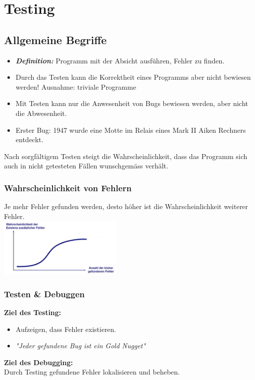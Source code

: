 \section{Testing}
\subsection{Allgemeine Begriffe}
\begin{itemize}
	\item \textbf{\textit{Definition:}} Programm mit der Absicht ausführen, Fehler zu finden. 
	\item Durch das Testen kann die Korrektheit eines Programms aber nicht bewiesen werden!
    \subitem Ausnahme: triviale Programme
	\item Mit Testen kann nur die Anwesenheit von Bugs bewiesen werden, aber nicht die Abwesenheit. 
	\item Erster Bug: 1947 wurde eine Motte im Relais eines Mark II Aiken Rechners entdeckt.
\end{itemize}
Nach sorgfältigem Testen steigt die Wahrscheinlichkeit, dass das Programm sich auch in nicht getesteten Fällen wunschgemäss verhält.
\begin{multicols}{2}
\subsubsection{Wahrscheinlichkeit von Fehlern}
Je mehr Fehler gefunden werden, desto höher ist die Wahrscheinlichkeit weiterer Fehler.\\
\includegraphics[width=6cm]{images/fehler_wkeit}
	
	\subsubsection{Testen \& Debuggen}
	\textbf{Ziel des Testing:} \\
	\begin{minipage}{10cm}
		\vspace{0.2cm}
		\begin{itemize}
			\item Aufzeigen, dass Fehler existieren.
			\item \textit{"{}Jeder gefundene Bug ist ein Gold Nugget"}
		\end{itemize}
		\textbf{Ziel des Debugging:} \\
		Durch Testing gefundene Fehler lokalisieren und beheben.		
	\end{minipage}
\end{multicols}


